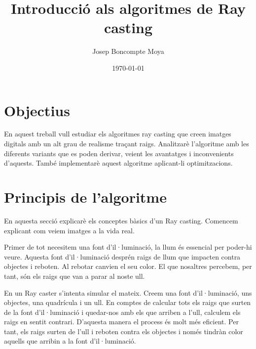 \documentclass{article}
\title{Introducció als algoritmes de Ray casting}
\author{Josep Boncompte Moya}
\date{\today}
\begin{document}
\maketitle
\printindex
\section{Objectius}
En aquest treball vull estudiar els algoritmes ray casting que creen imatges digitals amb un alt grau de realisme traçant raigs.
Analitzarè l'algoritme amb les diferents variants que es poden derivar, veient les avantatges i inconvenients d'aquests. 
També implementarè aquest algoritme aplicant-li optimitzacions.
\clearpage
\section{Principis de l'algoritme}
En aquesta secció explicarè els conceptes bàsics d'un Ray casting. Comencem explicant com veiem imatges a la vida real. 

Primer de tot necesitem una font d'il·luminació, la llum és essencial per
poder-hi veure. Aquesta font d'il·luminació desprén raigs de llum que impacten contra objectes i reboten. Al rebotar canvien el
seu color. El que nosaltres percebem, per tant, són els raigs que van a parar al noste ull.

En un Ray caster s'intenta simular el mateix. Creem una font d'il·luminació, uns objectes, una quadrícula i un ull. 
En comptes de calcular tots els raigs que surten de la font d'il·luminació i quedar-nos amb els
que arriben a l'ull, calculem els raigs en sentit contrari. D'aquesta manera el process és molt més eficient.
Per tant, els raigs surten de l'ull i reboten contra els objectes i només tindràn color aquells que arribin a la font
d'il·luminació.
\end{document}
